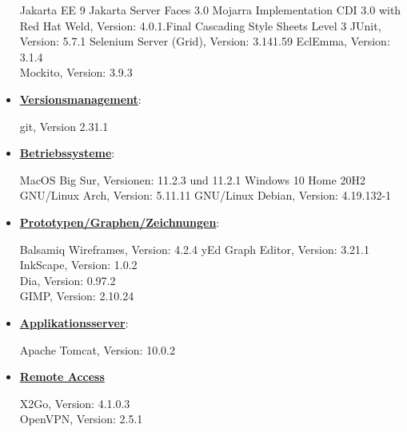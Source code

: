 \documentclass{article}
\begin{document}
\begin{itemize}
\begin{flushleft}
Jakarta EE 9 \linebreak
Jakarta Server Faces 3.0 Mojarra Implementation \linebreak
CDI 3.0 with Red Hat Weld, Version: 4.0.1.Final \linebreak
Cascading Style Sheets Level 3 \linebreak
JUnit, Version: 5.7.1 \linebreak
Selenium Server (Grid), Version: 3.141.59 \linebreak
EclEmma, Version: 3.1.4 \\
Mockito, Version: 3.9.3 \\
\end{flushleft}
\item \underline{\textbf{Versionsmanagement}}:
\begin{flushleft}
git, Version 2.31.1 \linebreak
\end{flushleft}
\item \underline{\textbf{Betriebssysteme}}:
\begin{flushleft}
MacOS Big Sur, Versionen: 11.2.3 und 11.2.1 \linebreak
Windows 10 Home 20H2 \linebreak
GNU/Linux Arch, Version: 5.11.11 \linebreak
GNU/Linux Debian, Version: 4.19.132-1 \linebreak
\end{flushleft}
\item \underline{\textbf{Prototypen/Graphen/Zeichnungen}}:
\begin{flushleft}
Balsamiq Wireframes, Version: 4.2.4 \linebreak 
yEd Graph Editor, Version: 3.21.1 \linebreak 
InkScape, Version: 1.0.2 \\
Dia, Version: 0.97.2 \\
GIMP, Version: 2.10.24 \\
\end{flushleft}
\item \underline{\textbf{Applikationsserver}}: 
\begin{flushleft}
Apache Tomcat, Version: 10.0.2 \linebreak
\end{flushleft}
\item \underline{\textbf{Remote Access}}
\begin{flushleft}
X2Go, Version: 4.1.0.3 \\
OpenVPN, Version: 2.5.1 \\

\end{flushleft}
\end{itemize}
\end{document}
